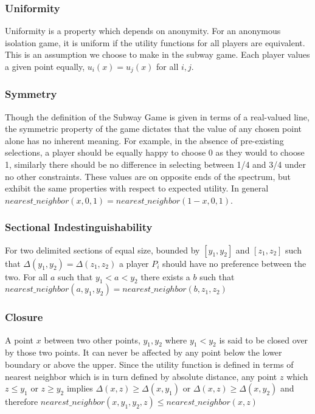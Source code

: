 \documentclass{acm_proc_article-sp}
\begin{document}
\subsubsection{Uniformity}
Uniformity is a property which depends on anonymity. For an anonymous isolation game, it is uniform if the utility functions for all players are equivalent\cite{zhao2008isolation}. This is an assumption we choose to make in the subway game. Each player values a given point equally, $u_i(x) = u_j(x)$ for all $i, j$.

\subsubsection{Symmetry}
Though the definition of the Subway Game is given in terms of a real-valued line, the symmetric property of the game dictates that the value of any chosen point alone has no inherent meaning. For example, in the absence of pre-existing selections, a player should be equally happy to choose 0 as they would to choose 1, similarly there should be no difference in selecting between 1/4 and 3/4 under no other constraints. These values are on opposite ends of the spectrum, but exhibit the same properties with respect to expected utility. In general $nearest\_neighbor(x, 0, 1) = nearest\_neighbor(1 - x, 0, 1)$.

\subsubsection{Sectional Indestinguishability}
For two delimited sections of equal size, bounded by $[y_1, y_2]$ and $[z_1, z_2]$ such that $\Delta(y_1, y_2) = \Delta(z_1, z_2)$ a player $P_i$ should have no preference between the two. For all $a$ such that $y_1 < a < y_2$ there exists a $b$ such that $nearest\_neighbor(a, y_1, y_2) = nearest\_neighbor(b, z_1, z_2)$

\subsubsection{Closure}
A point $x$ between two other points, $y_1, y_2$ where $y_1 < y_2$ is said to be closed over by those two points. It can never be affected by any point below the lower boundary or above the upper. Since the utility function is defined in terms of nearest neighbor which is in turn defined by absolute distance, any point $z$ which $z \leq y_1$ or $z \geq y_2$ implies $\Delta(x, z) \geq \Delta(x, y_1)$ or $\Delta(x, z) \geq \Delta(x, y_2)$ and therefore $nearest\_neighbor(x, y_1, y_2, z) \leq nearest\_neighbor(x, z)$
\end{document}

